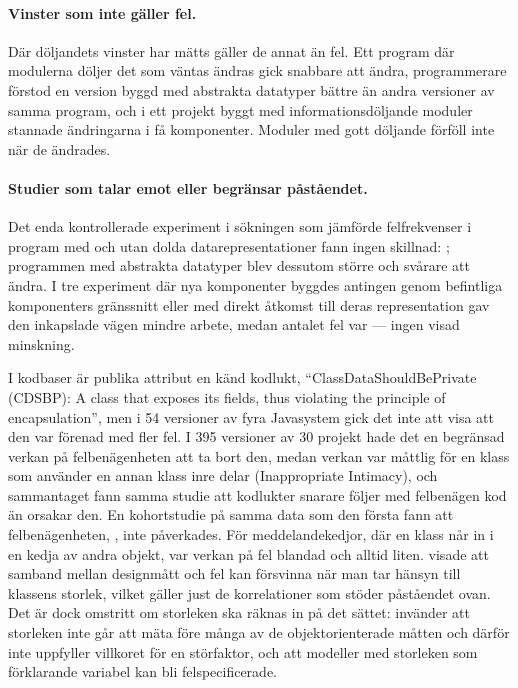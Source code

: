 \paragraph{Vinster som inte gäller fel.}  Där döljandets vinster har
mätts gäller de annat än fel.  Ett program där modulerna döljer det som
väntas ändras gick snabbare att ändra\autocite{Korson1986Modularity},
programmerare förstod en version byggd med abstrakta datatyper bättre än
andra versioner av samma program\autocite{Woodfield1981Modularization},
och i ett projekt byggt med informationsdöljande moduler stannade
ändringarna i få komponenter\autocite{Hager1994TRALAB}.  Moduler med gott
döljande förföll inte när de ändrades\autocite{RisingCalliss1993}.

\paragraph{Studier som talar emot eller begränsar påståendet.}  Det enda
kontrollerade experiment i sökningen som jämförde felfrekvenser i program
med och utan dolda datarepresentationer fann ingen skillnad:
; programmen med abstrakta datatyper blev dessutom
större och svårare att ändra.  I tre experiment där nya komponenter
byggdes antingen genom befintliga komponenters gränssnitt eller med
direkt åtkomst till deras representation gav den inkapslade vägen
mindre arbete, medan antalet fel var
 --- ingen visad
minskning.

I kodbaser är publika attribut en känd kodlukt,
\enquote{ClassDataShouldBePrivate (CDSBP): A class that exposes its
fields, thus violating the principle of encapsulation}, men i 54
versioner av fyra Javasystem gick det inte att visa att den var förenad
med fler fel\autocite[250, 257, 263]{Khomh2012Antipatterns}.  I 395
versioner av 30 projekt hade det en begränsad verkan på felbenägenheten
att ta bort den, medan verkan var måttlig för en klass som använder en
annan klass inre delar (\foreignlanguage{english}{Inappropriate
Intimacy}), och sammantaget fann samma studie att kodlukter snarare
följer med felbenägen kod än orsakar
den\autocite[1214--1215]{Palomba2018Smells}.  En kohortstudie på samma
data som den första fann att felbenägenheten,
, inte påverkades.
För meddelandekedjor, där en klass når in i en kedja av andra objekt,
var verkan på fel blandad och alltid liten\autocite{Hall2014Smells}.
\Textcite{ElEmam2001Confounding} visade att samband mellan designmått och
fel kan försvinna när man tar hänsyn till klassens storlek, vilket gäller
just de korrelationer som stöder påståendet ovan.  Det är dock omstritt
om storleken ska räknas in på det sättet: \textcite{Evanco2003Comments}
invänder att storleken inte går att mäta före många av de
objektorienterade måtten och därför inte uppfyller villkoret för en
störfaktor, och att modeller med storleken som förklarande variabel kan
bli felspecificerade.

